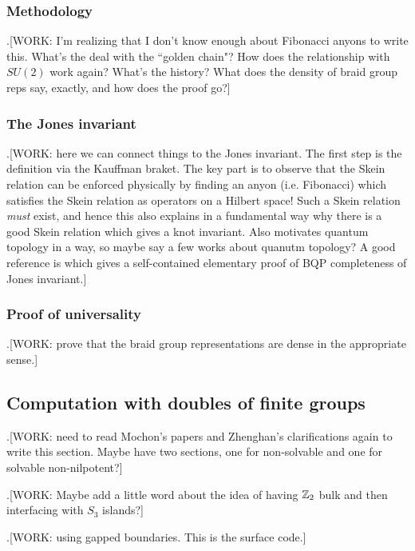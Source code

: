\subsubsection{Methodology}

.[WORK: I'm realizing that I don't know enough about Fibonacci anyons to write this. What's the deal with the ``golden chain"? How does the relationship with $SU(2)$ work again? What's the history? What does the density of braid group reps say, exactly, and how does the proof go?]

\subsubsection{The Jones invariant}

.[WORK: here we can connect things to the Jones invariant. The first step is the definition via the Kauffman braket. The key part is to observe that the Skein relation can be enforced physically by finding an anyon (i.e. Fibonacci) which satisfies the Skein relation as operators on a Hilbert space! Such a Skein relation \textit{must} exist, and hence this also explains in a fundamental way why there is a good Skein relation which gives a knot invariant. Also motivates quantum topology in a way, so maybe say a few works about quanutm topology? A good reference is \cite{aharonov2011bqp} which gives a self-contained elementary proof of BQP completeness of Jones invariant.]

\subsubsection{Proof of universality}

.[WORK: prove that the braid group representations are dense in the appropriate sense.]

\subsection{Computation with doubles of finite groups}

.[WORK: need to read Mochon's papers and Zhenghan's clarifications again to write this section. Maybe have two sections, one for non-solvable and one for solvable non-nilpotent?]

.[WORK: Maybe add a little word about the idea of having $\mathbb{Z}_2$ bulk and then interfacing with $S_3$ islands?]

.[WORK: using gapped boundaries. This is the surface code.]

